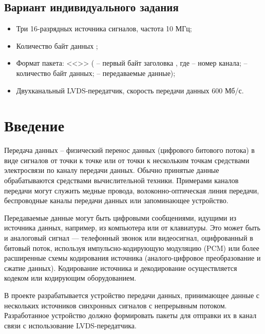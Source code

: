 \subsection*{Вариант индивидуального задания}

\begin{itemize}
	\item Три 16-разрядных источника сигналов, частота 10 МГц;
	\item Количество байт данных ;
	\item Формат пакета: <<>> ( -- первый байт заголовка , где  -- номер канала;  -- количество байт данных;  -- передаваемые данные);
 	\item Двухканальный LVDS-передатчик, скорость передачи данных $600$ Мб/с.
\end{itemize}

\newpage

\section*{Введение}

Передача данных -- физический перенос данных (цифрового битового потока) в виде сигналов от точки к точке или от точки к нескольким точкам средствами электросвязи по каналу передачи данных. Обычно принятые данные обрабатываются средствами вычислительной техники. Примерами каналов передачи могут служить медные провода, волоконно-оптическая линия передачи, беспроводные каналы передачи данных или запоминающее устройство.

Передаваемые данные могут быть цифровыми сообщениями, идущими из источника данных, например, из компьютера или от клавиатуры. Это может быть и аналоговый сигнал — телефонный звонок или видеосигнал, оцифрованный в битовый поток, используя импульсно-кодирующую модуляцию (PCM) или более расширенные схемы кодирования источника (аналого-цифровое преобразование и сжатие данных). Кодирование источника и декодирование осуществляется кодеком или кодирующим оборудованием.

В проекте разрабатывается устройство передачи данных, принимающее данные с нескольких источников синхронных сигналов с непрерывным потоком. Разработанное устройство должно формировать пакеты для отправки их в канал связи с использование LVDS-передатчика.

\newpage

